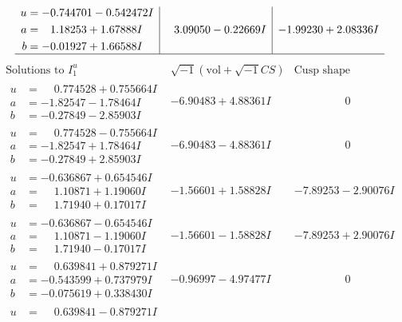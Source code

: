 \documentclass[1p]{elsarticle_modified}
\theoremstyle{definition}
\newcommand{\I}{\sqrt{-1}}
\begin{document}
$$\begin{array}{c|c|c}
\begin{aligned}
u &= -0.744701 - 0.542472 I \\
a &= \phantom{-}1.18253 + 1.67888 I \\
b &= -0.01927 + 1.66588 I\end{aligned}
 & \phantom{-}3.09050 - 0.22669 I & -1.99230 + 2.08336 I\\
 \hline 
 \end{array}$$\newpage$$\begin{array}{c|c|c}  
\text{Solutions to }I^u_{1}& \I (\text{vol} + \sqrt{-1}CS) & \text{Cusp shape}\\
 \hline 
\begin{aligned}
u &= \phantom{-}0.774528 + 0.755664 I \\
a &= -1.82547 - 1.78464 I \\
b &= -0.27849 - 2.85903 I\end{aligned}
 & -6.90483 + 4.88361 I & \phantom{-0.000000 } 0 \\ \hline\begin{aligned}
u &= \phantom{-}0.774528 - 0.755664 I \\
a &= -1.82547 + 1.78464 I \\
b &= -0.27849 + 2.85903 I\end{aligned}
 & -6.90483 - 4.88361 I & \phantom{-0.000000 } 0 \\ \hline\begin{aligned}
u &= -0.636867 + 0.654546 I \\
a &= \phantom{-}1.10871 + 1.19060 I \\
b &= \phantom{-}1.71940 + 0.17017 I\end{aligned}
 & -1.56601 + 1.58828 I & -7.89253 - 2.90076 I \\ \hline\begin{aligned}
u &= -0.636867 - 0.654546 I \\
a &= \phantom{-}1.10871 - 1.19060 I \\
b &= \phantom{-}1.71940 - 0.17017 I\end{aligned}
 & -1.56601 - 1.58828 I & -7.89253 + 2.90076 I \\ \hline\begin{aligned}
u &= \phantom{-}0.639841 + 0.879271 I \\
a &= -0.543599 + 0.737979 I \\
b &= -0.075619 + 0.338430 I\end{aligned}
 & -0.96997 - 4.97477 I & \phantom{-0.000000 } 0 \\ \hline\begin{aligned}
u &= \phantom{-}0.639841 - 0.879271 I \\

\end{aligned}
\end{array}$$
\end{document}

